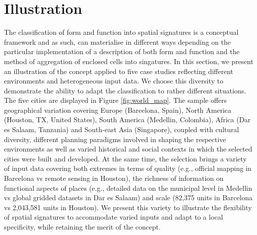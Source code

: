 \section{Illustration}
\label{sec:app}



The classification of form and function into spatial signatures is a conceptual framework and
as such, can materialise in different ways depending on the particular implementation of
a description of both form and function and the method of aggregation of enclosed cells
into singatures.
In this section, we present an illustration of the concept applied to five
case studies reflecting different environments and heterogeneous input data.
We choose this diversity to demonstrate the ability to adapt the
classification to rather different situations.
The five cities are displayed in Figure \ref{fig:world_map}.
The sample offers geographical variation covering Europe (Barcelona, Spain), North
America (Houston, TX, United States), South America (Medellin, Colombia), Africa (Dar es
Salaam, Tanzania) and South-east Asia (Singapore),
coupled with cultural diversity, different planning paradigms involved in shaping the
respective environments as well as varied historical and social contexts in which the
selected cities were built and developed.
At the same time, the selection brings a variety of input data covering both extremes in
terms of quality (e.g., official mapping in Barcelona vs remote sensing in Houston), the
richness of information on functional aspects of places (e.g., detailed data on the
municipal level in Medellin vs global gridded datasets in Dar es Salaam) and scale
(82,375 units in Barcelona vs 2,043,581 units in Houston).
We present this variety to illustrate the flexibility of spatial signatures to
accommodate varied inputs and adapt to a local specificity, while retaining the merit of
the concept.

